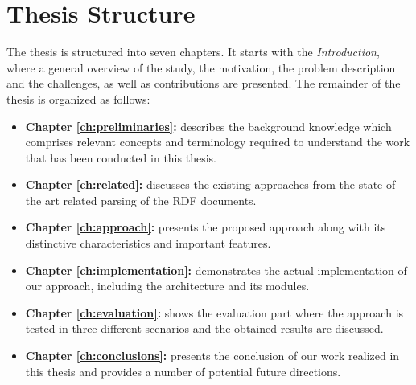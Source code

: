 \section {Thesis Structure}
The thesis is structured into seven chapters. 
It starts with the \emph{Introduction}, where a general overview of the study, the motivation, the problem description and the challenges, as well as contributions are presented. 
The remainder of the thesis is organized as follows:
\begin{itemize}
	\item { \textbf{Chapter \ref{ch:preliminaries}:} describes the background knowledge which comprises relevant concepts and terminology required to understand the work that has been conducted in this thesis.}
	
	\item {\textbf{Chapter \ref{ch:related}:}} discusses the existing approaches from the state of the art related parsing of the RDF documents. 
		
	\item {\textbf{Chapter \ref{ch:approach}:}} presents the proposed approach along with its distinctive characteristics and important features. 
	
	\item {\textbf{Chapter \ref{ch:implementation}:}} demonstrates the actual implementation of our approach, including the architecture and its modules.
	
	\item {\textbf{Chapter \ref{ch:evaluation}:}} shows the evaluation part where the approach is tested in three different scenarios and the obtained results are discussed.

	\item {\textbf{Chapter \ref{ch:conclusions}:}} presents the conclusion of our work realized in this thesis and provides a number of potential future directions.
\end{itemize}







